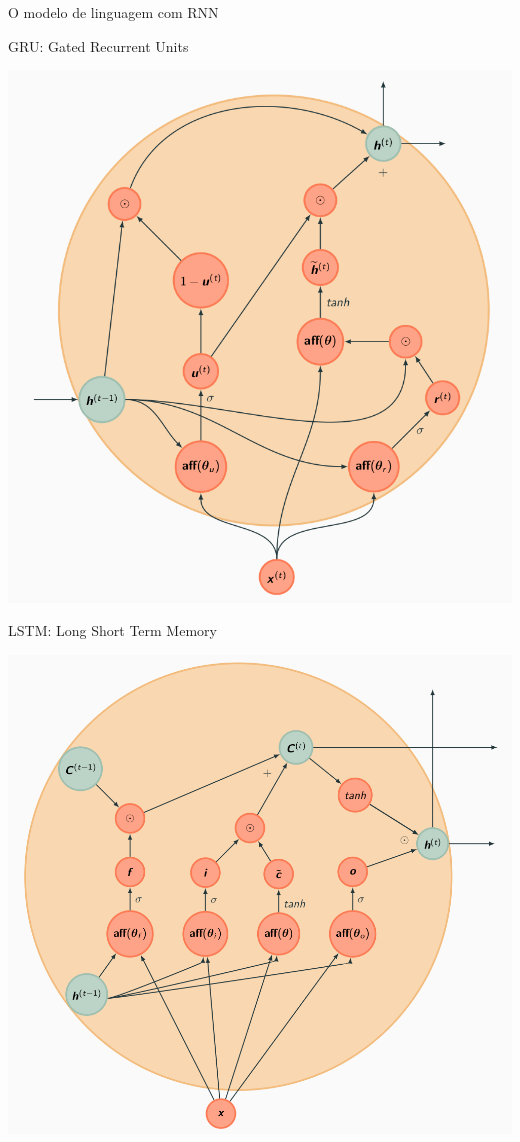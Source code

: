 \documentclass[10pt]{beamer}
\begin{document}
\begin{frame}{O modelo de linguagem com RNN}

\end{frame}



\begin{frame}{GRU: Gated Recurrent Units}
\begin{center}
\includegraphics[scale=0.25]{images/gru.png}
\end{center}
\end{frame}


\begin{frame}{LSTM: Long Short Term Memory}
\begin{center}
\includegraphics[scale=0.23]{images/lstm.png}
\end{center}
\end{frame}
\end{document}
